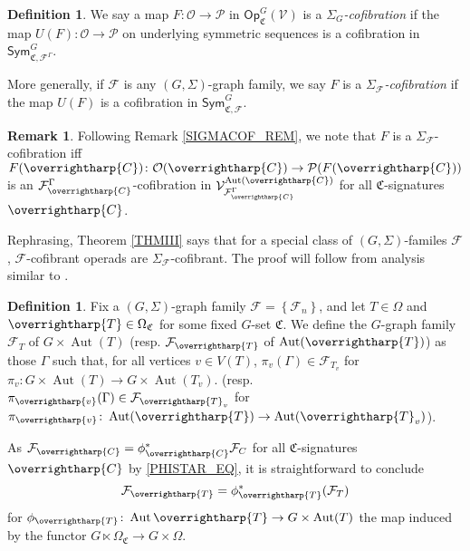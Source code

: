 \documentclass[a4paper,10pt
,draft
]{article}%
\numberwithin{equation}{section}
\numberwithin{figure}{section}
\theoremstyle{definition} %
\newtheorem{definition}[equation]{Definition}%
\newtheorem{example}[equation]{Example}%
\newtheorem{remark}[equation]{Remark}%
\newcommand{\set}[1]{\left\{#1\right\}}%
\newcommand{\vect}[1]{\text{\overrightharp{\ensuremath{#1}}}}
\newcommand{\Sym}{\ensuremath{\mathsf{Sym}}}%
\newcommand{\sSet}{\ensuremath{\mathsf{sSet}}}%
\newcommand{\Op}{\mathsf{Op}}%
\DeclareMathOperator{\Aut}{Aut}%
\newcommand{\F}{\ensuremath{\mathcal F}}
\newcommand{\V}{\ensuremath{\mathcal V}}
\renewcommand{\O}{\ensuremath{\mathcal O}}
\renewcommand{\P}{\ensuremath{\mathcal P}}
\newcommand{\1}{\ensuremath{\mathbbm 1}}%
\begin{document}
\begin{definition}
      We say a map $F \colon \O \to \P$ in $\Op^G_{\mathfrak C}(\V)$ is a \textit{$\Sigma_G$-cofibration} if
      the map $U(F) \colon \O \to \P$ on underlying symmetric sequences is a cofibration in $\Sym^G_{\mathfrak C, \F^\Gamma}$.
      
      More generally, if $\F$ is any $(G,\Sigma)$-graph family, we say $F$ is a \textit{$\Sigma_\F$-cofibration}
      if the map $U(F)$ is a cofibration in $\Sym^G_{\mathfrak C, \F}$.
\end{definition}

\begin{remark}
      Following Remark \ref{SIGMACOF_REM}, we note that 
      $F$ is a $\Sigma_\F$-cofibration iff 
      $F(\vect C)\colon \O(\vect C) \to \P(F(\vect C))$ is an $\mathcal F^\Gamma_{\vect C}$-cofibration in $\V^{\Aut(\vect C)}_{\F^\Gamma_{\vect  C}}$
      for all $\mathfrak C$-signatures $\vect C$.
\end{remark}     


Rephrasing, Theorem \ref{THMIII} says that for a special class of $(G,\Sigma)$-familes $\F$, $\F$-cofibrant operads are $\Sigma_\F$-cofibrant.
The proof will follow from analysis similar to \cite[\S 6]{BP_geo}.

\begin{definition}
      Fix a $(G,\Sigma)$-graph family $\F = \set{\F_n}$, and let $T \in \Omega$ and $\vect T \in \Omega_{\mathfrak C}$ for some fixed $G$-set $\mathfrak C$.
      We define the $G$-graph family $\F_T$ of $G \times \Aut(T)$ (resp. $\F_{\vect T}$ of $\Aut(\vect T)$)
      as those $\Gamma$ such that,
      for all vertices $v \in V(T)$, $\pi_v(\Gamma) \in \F_{T_v}$ for $\pi_v \colon G \times \Aut(T) \to G \times \Aut(T_v)$.
      (resp. $\pi_{\vect v}(\Gamma) \in \F_{\vect T_v}$ for $\pi_{\vect v} \colon \Aut(\vect T) \to \Aut(\vect T_v)$).

      As $\F_{\vect C} = \phi_{\vect C}^{\**}\F_C$ for all $\mathfrak C$-signatures $\vect C$ by \eqref{PHISTAR_EQ},
      it is straightforward to conclude
      \begin{equation}
            \label{FVT_EQ}
            \F_{\vect T} = \phi_{\vect T}^{\**}(\F_T)
      \end{equation}
      for $\phi_{\vect T} \colon \Aut{\vect T} \to G \times \Aut(T)$ the map induced by the functor $G \ltimes \Omega_{\mathfrak C} \to G \times \Omega$.
\end{definition}
\end{document}
